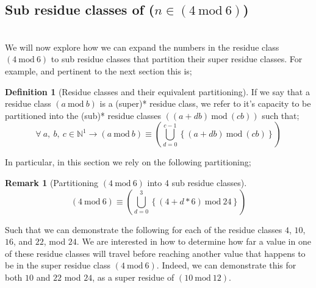 \documentclass[12pt,a4paper]{amsart}
\numberwithin{equation}{section}
\theoremstyle{plain}
\theoremstyle{definition}
\newtheorem{Def}[Th]{Definition}
\newtheorem{Rem}[Th]{Remark}
\begin{document}
\subsection{Sub residue classes of ($n \in \left ( 4\:\mathrm{mod}\:6 \right )$)} \hfill\\

We will now explore how we can expand the numbers in the residue class $\left ( 4\:\mathrm{mod}\:6 \right )$ to sub residue classes that partition their super residue classes. For example, and pertinent to the next section this is;

\begin{Def}[Residue classes and their equivalent partitioning]
If we say that a residue class $\left ( a\:\mathrm{mod}\:b \right )$ is a (super)* residue class, we refer to it's capacity to be partitioned into the (sub)* residue classes $\left ( \left (a+db  \right )\:\mathrm{mod}\:\left (cb  \right ) \right )$ such that;
\begin{equation}
\forall \:a\mathrm{,}\:b\mathrm{,}\:c \in \mathbb{N}^{1} \rightarrow \left ( a\:\mathrm{mod}\:b \right ) \equiv \left (\bigcup_{d=0}^{c-1} \left \{ \left (a+db  \right )\:\mathrm{mod}\:\left (cb  \right ) \right \}  \right )
\end{equation}
\end{Def}

In particular, in this section we rely on the following partitioning; 

\begin{Rem}[Partitioning $\left ( 4\:\mathrm{mod}\:6 \right )$ into 4 sub residue classes]
\begin{equation}
\left ( 4\:\mathrm{mod}\:6 \right ) \equiv \left (\bigcup_{d=0}^{3} \left \{ \left (4+d*6  \right )\:\mathrm{mod}\:24 \right \}  \right )
\end{equation}
\end{Rem}

Such that we can demonstrate the following for each of the residue classes $4$, $10$, $16$, and $22$, mod $24$. We are interested in how to determine how far a value in one of these residue classes will travel before reaching another value that happens to be in the super residue class $\left ( 4\:\mathrm{mod}\:6 \right )$. Indeed, we can demonstrate this for both $10$ and $22$ mod $24$, as a super residue of $\left ( 10\:\mathrm{mod}\:12 \right )$.
\end{document}
